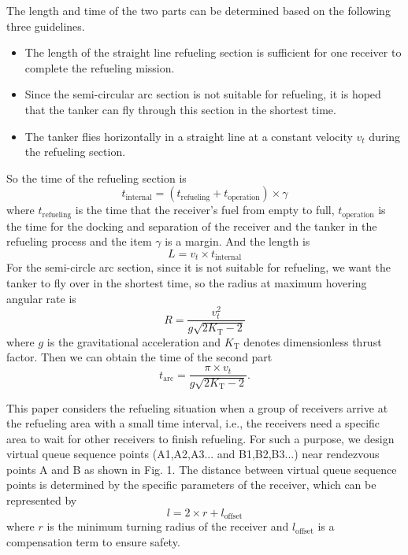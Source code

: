 The length and time of the two parts can be determined based on the following three guidelines.
\begin{itemize}
	\item The length of the straight line refueling section is sufficient for one receiver to complete the refueling mission.
	\item Since the semi-circular arc section is not suitable for refueling, it is hoped that the tanker can fly through this section in the shortest time.
	\item The  tanker flies horizontally in a straight line at a constant velocity $ v_{t} $ during the refueling section.
\end{itemize}
So the time of the refueling section is 
\begin{equation}
{t}_{\text{internal}}=(t_{\text{refueling}}+t_{\text{operation}}) \times \gamma
\end{equation}
where $ {t}_{\text{refueling}} $ is the time that the receiver's fuel from empty to full, $ {t}_{\text{operation}} $ is the time for the docking and separation of the receiver and the tanker in the refueling process and the item $ {\gamma} $ is a margin.
And the length is 
\begin{equation}
{L}=v_{t}\times{t}_{\text{internal}}
\end{equation}
For the semi-circle arc section, since it is not suitable for refueling, we want the tanker to fly over in the shortest time, so the radius at maximum hovering angular rate is  
\begin{equation}
{R}=\dfrac{v_{t}^{2}}{g\sqrt{2K_{\text{T}}-2}}
\end{equation}
where $ {g} $ is the gravitational acceleration and $ {K}_{\text{T}} $ denotes dimensionless thrust factor. Then we can obtain the time of the second part
\begin{equation}
{t_{\text{arc}}}=\dfrac{\pi \times v_{t}}{g\sqrt{2K_{\text{T}}-2}}.
\end{equation}

This paper considers the refueling situation when a group of receivers arrive at the refueling area with a small time interval, i.e., the receivers need a specific area to wait for other receivers to finish refueling. For such a purpose, we design virtual queue sequence points (A1,A2,A3... and B1,B2,B3...) near rendezvous points A and B as shown in Fig. 1. The distance between virtual queue sequence points is determined by the specific parameters of the receiver, which can be represented by
\begin{equation}
{l}=2 \times r+l_{\text{offset}}
\end{equation}
where $ {r} $ is the minimum turning radius of the receiver and $ {l}_{\text{offset}} $ is a compensation term to ensure safety.




